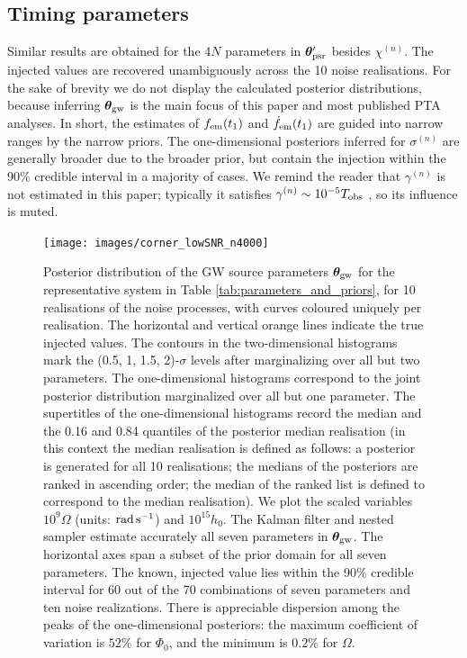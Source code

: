 \documentclass[fleqn,usenatbib,useAMS]{mnras}
\begin{document}
\subsection{Timing parameters} \label{sec:timing_parameters}
Similar results are obtained for the 4$N$ parameters in $\boldsymbol{\theta}_{\rm psr}'$ besides $\chi^{(n)}$. The injected values are recovered unambiguously across the 10 noise realisations. For the sake of brevity we do not display the calculated posterior distributions, because inferring $\boldsymbol{\theta}_{\rm gw}$ is the main focus of this paper and most published PTA analyses. In short, the estimates of $f_{\rm em}(t_1)$ and $\dot{f}_{\rm em}(t_1)$ are guided into narrow ranges by the narrow priors. The one-dimensional posteriors inferred for $\sigma^{(n)}$ are generally broader due to the broader prior, but contain the injection within the  90\% credible interval in a majority of cases. We remind the reader that $\gamma^{(n)}$ is not estimated in this paper; typically it satisfies $\gamma^{(n)} \sim 10^{-5} T_{\rm obs}$ \citep{Price2012,Myers2021MNRAS.502.3113M,Meyers2021,Vargas}, so its influence is muted. \newline 



  

\begin{figure}
	\texttt{[image: images/corner\_lowSNR\_n4000]}
	\caption[Caption of LOF]{Posterior distribution of the GW source parameters $\boldsymbol{\theta}_{\rm gw}$ for the representative system in Table \ref{tab:parameters_and_priors}, for 10 realisations of the noise processes, with curves coloured uniquely per realisation. The horizontal and vertical orange lines indicate the true injected values. The contours in the two-dimensional histograms mark the (0.5, 1, 1.5, 2)-$\sigma$ levels after marginalizing over all but two parameters. The one-dimensional histograms correspond to the joint posterior distribution marginalized over all but one parameter. The supertitles of the one-dimensional histograms record the median and the 0.16 and 0.84 quantiles of the posterior median realisation (in this context the median realisation is defined as follows: a posterior is generated for all 10 realisations; the medians of the posteriors are ranked in ascending order; the median of the ranked list is defined to correspond to the median realisation). We plot the scaled variables $10^9 \Omega$ (units: ${\rm rad \, s^{-1}}$) and $10^{15} h_0$. The Kalman filter and nested sampler estimate accurately all seven parameters in ${\boldsymbol{\theta}}_{\rm gw}$. The horizontal axes span a subset of the prior domain for all seven parameters. The known, injected value lies within the 90\% credible interval for 60 out of the 70 combinations of seven parameters and ten noise realizations. There is appreciable dispersion among the peaks of the one-dimensional posteriors: the maximum coefficient of variation is $52 \%$ for $\Phi_0$, and the minimum is $0.2 \%$ for $\Omega$.}
	\label{fig:corner_plot_1}
\end{figure}
\end{document}
